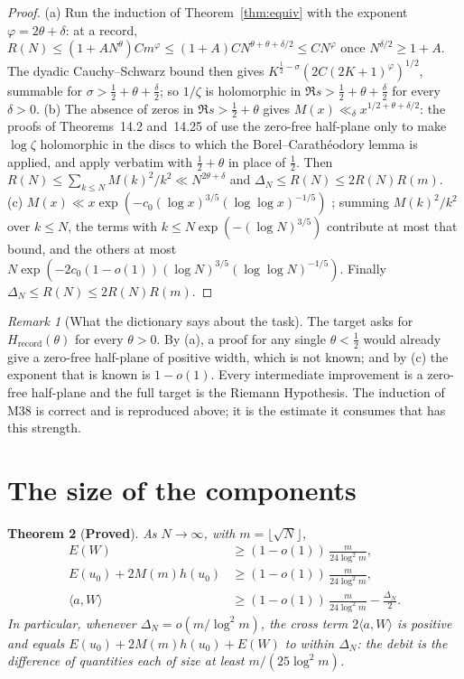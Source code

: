 \documentclass[11pt]{article}
\newtheorem{theorem}{Theorem}[section]
\theoremstyle{definition}
\theoremstyle{remark}
\newtheorem{remark}[theorem]{Remark}
\newcommand{\ip}[2]{\langle #1,#2\rangle}
\newcommand{\Hrec}{H_{\mathrm{record}}}
\begin{document}
\begin{proof}
(a) Run the induction of Theorem~\ref{thm:equiv} with the exponent $\varphi=2\theta+\delta$: at a record, $R(N)\le(1+AN^\theta)Cm^{\varphi}\le(1+A)CN^{\theta+\theta+\delta/2}\le CN^{\varphi}$ once $N^{\delta/2}\ge1+A$. The dyadic Cauchy--Schwarz bound then gives $K^{\frac12-\sigma}(2C(2K+1)^{\varphi})^{1/2}$, summable for $\sigma>\tfrac12+\theta+\tfrac\delta2$; so $1/\zeta$ is holomorphic in $\Re s>\tfrac12+\theta+\tfrac\delta2$ for every $\delta>0$. (b) The absence of zeros in $\Re s>\tfrac12+\theta$ gives $M(x)\ll_\delta x^{1/2+\theta+\delta/2}$: the proofs of Theorems~14.2 and~14.25 of \cite{titchmarsh} use the zero-free half-plane only to make $\log\zeta$ holomorphic in the discs to which the Borel--Carath\'eodory lemma is applied, and apply verbatim with $\tfrac12+\theta$ in place of $\tfrac12$. Then $R(N)\le\sum_{k\le N}M(k)^2/k^2\ll N^{2\theta+\delta}$ and $\Delta_N\le R(N)\le2R(N)R(m)$. (c) $M(x)\ll x\exp(-c_0(\log x)^{3/5}(\log\log x)^{-1/5})$ \cite[Theorem~12.7]{ivic}; summing $M(k)^2/k^2$ over $k\le N$, the terms with $k\le N\exp(-(\log N)^{3/5})$ contribute at most that bound, and the others at most $N\exp(-2c_0(1-o(1))(\log N)^{3/5}(\log\log N)^{-1/5})$. Finally $\Delta_N\le R(N)\le2R(N)R(m)$.
\end{proof}

\begin{remark}[What the dictionary says about the task]
The target asks for $\Hrec(\theta)$ for every $\theta>0$. By (a), a proof for any single $\theta<\tfrac12$ would already give a zero-free half-plane of positive width, which is not known; and by (c) the exponent that is known is $1-o(1)$. Every intermediate improvement is a zero-free half-plane and the full target is the Riemann Hypothesis. The induction of M38 is correct and is reproduced above; it is the estimate it consumes that has this strength.
\end{remark}

\section{The size of the components}\label{sec:components}

\begin{theorem}[\textbf{Proved}]\label{thm:components}
As $N\to\infty$, with $m=\lfloor\sqrt N\rfloor$,
\begin{align}
E(W)&\ge(1-o(1))\,\frac m{24\log^2m},\label{eq:lowW}\\
E(u_0)+2M(m)h(u_0)&\ge(1-o(1))\,\frac m{24\log^2m},\label{eq:lowU}\\
\ip aW&\ge(1-o(1))\,\frac m{24\log^2m}-\frac{\Delta_N}2 .\label{eq:lowAW}
\end{align}
In particular, whenever $\Delta_N=o(m/\log^2m)$, the cross term $2\ip aW$ is positive and equals $E(u_0)+2M(m)h(u_0)+E(W)$ to within $\Delta_N$: the debit is the difference of quantities each of size at least $m/(25\log^2m)$.
\end{theorem}
\end{document}
